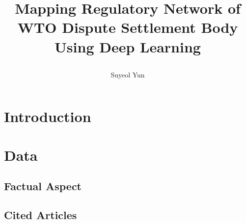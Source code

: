 \documentclass[12pt,letterpaper]{article}
\newcommand{\tit}{
\bf 
Mapping Regulatory Network of WTO Dispute Settlement Body Using Deep Learning
}
\newcommand\spacingset[1]{\renewcommand{\baselinestretch}
{#1}\small\normalsize}
\begin{document}
\spacingset{1.25}

\setcounter{page}{0}
\vspace{-.1in}

{\title{
    \tit
  }
  \author{Suyeol Yun
  }
  \maketitle
}

\thispagestyle{empty}
\vspace{-.1in}

\begin{abstract}
\end{abstract}

\spacingset{1.5} %

% 

\section{Introduction}










\clearpage

\section{Data}


% 

\subsection{Factual Aspect}


\subsection{Cited Articles}

\end{document}
